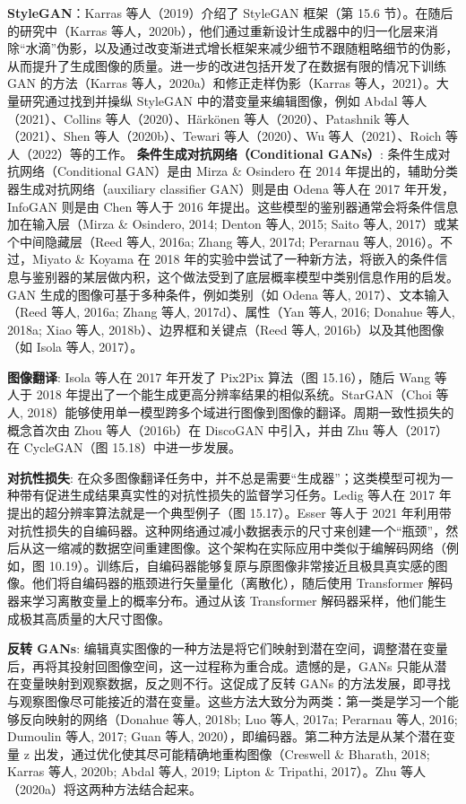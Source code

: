 \documentclass[lang=cn,newtx,10pt,scheme=chinese]{elegantbook}
\begin{document}
\textbf{StyleGAN}：Karras 等人（2019）介绍了 StyleGAN 框架（第 15.6 节）。在随后的研究中（Karras 等人，2020b），他们通过重新设计生成器中的归一化层来消除“水滴”伪影，以及通过改变渐进式增长框架来减少细节不跟随粗略细节的伪影，从而提升了生成图像的质量。进一步的改进包括开发了在数据有限的情况下训练 GAN 的方法（Karras 等人，2020a）和修正走样伪影（Karras 等人，2021）。大量研究通过找到并操纵 StyleGAN 中的潜变量来编辑图像，例如 Abdal 等人（2021）、Collins 等人（2020）、Härkönen 等人（2020）、Patashnik 等人（2021）、Shen 等人（2020b）、Tewari 等人（2020）、Wu 等人（2021）、Roich 等人（2022）等的工作。
\textbf{条件生成对抗网络（Conditional GANs）}: 条件生成对抗网络（Conditional GAN）是由 Mirza \& Osindero 在 2014 年提出的，辅助分类器生成对抗网络（auxiliary classifier GAN）则是由 Odena 等人在 2017 年开发，InfoGAN 则是由 Chen 等人于 2016 年提出。这些模型的鉴别器通常会将条件信息加在输入层（Mirza \& Osindero, 2014; Denton 等人, 2015; Saito 等人, 2017）或某个中间隐藏层（Reed 等人, 2016a; Zhang 等人, 2017d; Perarnau 等人, 2016）。不过，Miyato \& Koyama 在 2018 年的实验中尝试了一种新方法，将嵌入的条件信息与鉴别器的某层做内积，这个做法受到了底层概率模型中类别信息作用的启发。GAN 生成的图像可基于多种条件，例如类别（如 Odena 等人, 2017）、文本输入（Reed 等人, 2016a; Zhang 等人, 2017d）、属性（Yan 等人, 2016; Donahue 等人, 2018a; Xiao 等人, 2018b）、边界框和关键点（Reed 等人, 2016b）以及其他图像（如 Isola 等人, 2017）。

\textbf{图像翻译}: Isola 等人在 2017 年开发了 Pix2Pix 算法（图 15.16），随后 Wang 等人于 2018 年提出了一个能生成更高分辨率结果的相似系统。StarGAN（Choi 等人, 2018）能够使用单一模型跨多个域进行图像到图像的翻译。周期一致性损失的概念首次由 Zhou 等人（2016b）在 DiscoGAN 中引入，并由 Zhu 等人（2017）在 CycleGAN（图 15.18）中进一步发展。

\textbf{对抗性损失}: 在众多图像翻译任务中，并不总是需要“生成器”；这类模型可视为一种带有促进生成结果真实性的对抗性损失的监督学习任务。Ledig 等人在 2017 年提出的超分辨率算法就是一个典型例子（图 15.17）。Esser 等人于 2021 年利用带对抗性损失的自编码器。这种网络通过减小数据表示的尺寸来创建一个“瓶颈”，然后从这一缩减的数据空间重建图像。这个架构在实际应用中类似于编解码网络（例如，图 10.19）。训练后，自编码器能够复原与原图像非常接近且极具真实感的图像。他们将自编码器的瓶颈进行矢量量化（离散化），随后使用 Transformer 解码器来学习离散变量上的概率分布。通过从该 Transformer 解码器采样，他们能生成极其高质量的大尺寸图像。

\textbf{反转 GANs}: 编辑真实图像的一种方法是将它们映射到潜在空间，调整潜在变量后，再将其投射回图像空间，这一过程称为重合成。遗憾的是，GANs 只能从潜在变量映射到观察数据，反之则不行。这促成了反转 GANs 的方法发展，即寻找与观察图像尽可能接近的潜在变量。这些方法大致分为两类：第一类是学习一个能够反向映射的网络（Donahue 等人, 2018b; Luo 等人, 2017a; Perarnau 等人, 2016; Dumoulin 等人, 2017; Guan 等人, 2020），即编码器。第二种方法是从某个潜在变量 z 出发，通过优化使其尽可能精确地重构图像（Creswell \& Bharath, 2018; Karras 等人, 2020b; Abdal 等人, 2019; Lipton \& Tripathi, 2017）。Zhu 等人（2020a）将这两种方法结合起来。
\end{document}
